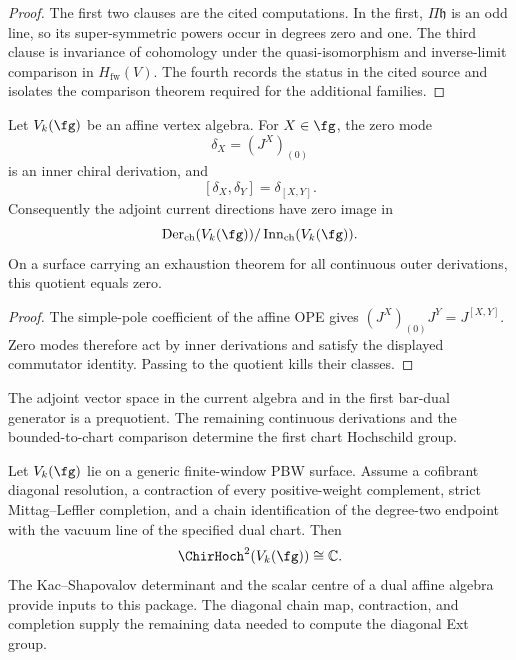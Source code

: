 \begin{proof}
The first two clauses are the cited computations.  In the first,
\(\Pi\mathfrak h\) is an odd line, so its super-symmetric powers occur
in degrees zero and one.  The third clause is invariance of cohomology
under the quasi-isomorphism and inverse-limit comparison in
\(H_{\mathrm{fw}}(V)\).  The fourth records the status in the cited
source and isolates the comparison theorem required for the
additional families.
\end{proof}

\begin{proposition}
\label{prop:chirhoch1-affine-km}
Let \(V_k(\fg)\) be an affine vertex algebra.  For \(X\in\fg\), the
zero mode
\[
 \delta_X=(J^X)_{(0)}
\]
is an inner chiral derivation, and
\[
 [\delta_X,\delta_Y]=\delta_{[X,Y]}.
\]
Consequently the adjoint current directions have zero image in
\[
 \operatorname{Der}_{\mathrm{ch}}(V_k(\fg))/
 \operatorname{Inn}_{\mathrm{ch}}(V_k(\fg)).
\]
On a surface carrying an exhaustion theorem for all continuous outer
derivations, this quotient equals zero.
\end{proposition}

\begin{proof}
The simple-pole coefficient of the affine OPE gives
\((J^X)_{(0)}J^Y=J^{[X,Y]}\).  Zero modes therefore act by inner
derivations and satisfy the displayed commutator identity.  Passing to
the quotient kills their classes.
\end{proof}

\begin{remark}
\label{rem:sl2-chirhoch-dim5}
The adjoint vector space in the current algebra and in the first
bar-dual generator is a prequotient.  The remaining continuous
derivations and the bounded-to-chart comparison determine the first
chart Hochschild group.
\end{remark}

\begin{proposition}
\label{prop:chirhoch2-affine-km-general}
Let \(V_k(\fg)\) lie on a generic finite-window PBW surface.  Assume a
cofibrant diagonal resolution, a contraction of every positive-weight
complement, strict Mittag--Leffler completion, and a chain
identification of the degree-two endpoint with the vacuum line of the
specified dual chart.  Then
\[
 \ChirHoch^2(V_k(\fg))\cong\mathbb C.
\]
The Kac--Shapovalov determinant and the scalar centre of a dual affine
algebra provide inputs to this package.  The diagonal chain map,
contraction, and completion supply the remaining data needed to
compute the diagonal Ext group.
\end{proposition}

